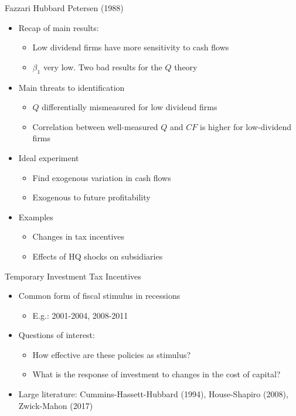\documentclass[11pt,aspectratio=169,xcolor={dvipsnames},hyperref={pdftex,pdfpagemode=UseNone,hidelinks,pdfdisplaydoctitle=true},usepdftitle=false]{beamer}
\begin{document}
\begin{frame}{Fazzari Hubbard Petersen (1988)}
\begin{itemize}
\item Recap of main results:
\begin{itemize}
\item Low dividend firms have more sensitivity to cash flows
\item $\beta_1$ very low. Two bad results for the $Q$ theory
\end{itemize}
\item Main threats to identification
\begin{itemize}
\pause
\item $Q$ differentially mismeasured for low dividend firms
\pause
\item Correlation between well-measured $Q$ and $CF$ is higher for low-dividend firms
\end{itemize}
\pause
\item Ideal experiment
\begin{itemize}
\item Find exogenous variation in cash flows
\item Exogenous to future profitability
\end{itemize}
\item Examples
\pause
\begin{itemize}
\item Changes in tax incentives
\item Effects of HQ shocks on subsidiaries
\end{itemize}
\end{itemize}
\end{frame}



\begin{frame}{Temporary Investment Tax Incentives}
\begin{itemize}
	\itemsep1em 
	\item Common form of fiscal stimulus in recessions
	\begin{itemize}
		\item E.g.: 2001-2004, 2008-2011
	\end{itemize}
	\pause
	\item Questions of interest:
	\begin{itemize}
		\item How effective are these policies as stimulus?
		\item What is the response of investment to changes in the cost of capital?
	\end{itemize}
	\item Large literature: {\small Cummins-Hassett-Hubbard (1994), House-Shapiro (2008), Zwick-Mahon (2017)}
\end{itemize}
\end{frame}
\end{document}
